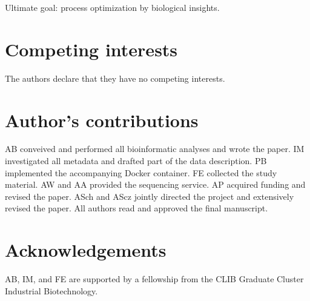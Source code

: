 \documentclass{bmcart}
\begin{document}
Ultimate goal: process optimization by biological insights.


\begin{backmatter}

\section*{Competing interests}
The authors declare that they have no competing interests.

\section*{Author's contributions}
AB conveived and performed all bioinformatic analyses and wrote the paper.
IM investigated all metadata and drafted part of the data description.
PB implemented the accompanying Docker container.
FE collected the study material.
AW and AA provided the sequencing service.
AP acquired funding and revised the paper.
ASch and AScz jointly directed the project and extensively revised the paper.
All authors read and approved the final manuscript.

\section*{Acknowledgements}
AB, IM, and FE are supported by a fellowship from the CLIB Graduate Cluster Industrial Biotechnology.



\end{backmatter}
\end{document}
